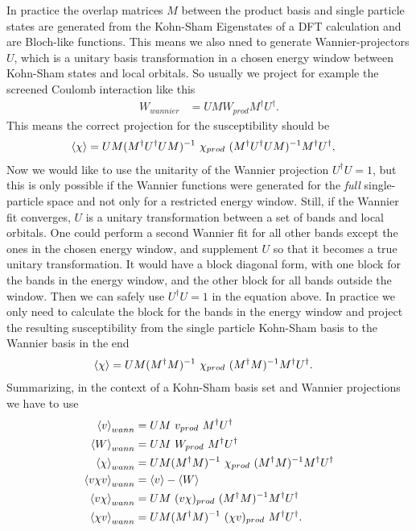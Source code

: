 \documentclass[12pt,a4paper]{scrartcl}
\numberwithin{equation}{section}
\begin{document}
In practice the overlap matrices $M$ between the product basis  
and single particle states are generated from the Kohn-Sham Eigenstates
of a DFT calculation and are Bloch-like functions. This means we also nned to generate 
Wannier-projectors $U$, which is a unitary basis transformation in a chosen energy window
between Kohn-Sham states and local orbitals. So usually we project for example the screened 
Coulomb interaction like this
\begin{align}
 W_{wannier} &= UM W_{prod}M^{\dagger} U^{\dagger}.
\end{align}
This means the correct projection for the susceptibility should be
\begin{align}
 \braket{\chi} &=  U M ( M^{\dagger} U^{\dagger} U M )^{-1} \ \chi_{prod} \ ( M^{\dagger} U^{\dagger} U M )^{-1} M^{\dagger} U^{\dagger},
\end{align}
Now we would like to use the unitarity of the Wannier projection $U^{\dagger} U= 1$, but this is only possible
if the Wannier functions were generated for the \textit{full} single-particle space and not only
for a restricted energy window. Still, if the Wannier fit converges, $U$ is a unitary transformation
between a set of bands and local orbitals. One could perform a second Wannier fit for all other bands except
the ones in the chosen energy window, and supplement $U$ so that it becomes a true unitary transformation.
It would have a block diagonal form, with one block for the bands in the energy window, and the other
block for all bands outside the window.
Then we can safely use $U^{\dagger} U= 1$ in the equation above. In practice we only need to calculate 
the block for the bands in the energy window and project the resulting susceptibility from the 
single particle Kohn-Sham basis to the Wannier basis in the end
\begin{align}
 \braket{\chi} &=  U M ( M^{\dagger} M )^{-1} \ \chi_{prod} \ ( M^{\dagger} M )^{-1} M^{\dagger} U^{\dagger}.
\end{align}
Summarizing, in the context of a Kohn-Sham basis set and Wannier projections we have to use 
\begin{align}
\braket{v}_{wann} &= U M\ v_{prod} \ M^{\dagger} U^{\dagger} \\
 \braket{W}_{wann} &= U M\ W_{prod} \ M^{\dagger} U^{\dagger} \\
 \braket{\chi}_{wann} &= U M ( M^{\dagger} M )^{-1} \ \chi_{prod} \ ( M^{\dagger} M )^{-1} M^{\dagger} U^{\dagger}\\
 \braket{v\chi v}_{wann} &= \braket{v}-\braket{W}\\
 \braket{v \chi}_{wann} &= U M\  (v \chi)_{prod} \ ( M^{\dagger} M )^{-1} M^{\dagger} U^{\dagger}\\
 \braket{\chi v}_{wann} &= U M ( M^{\dagger} M )^{-1}\  (\chi v)_{prod} \ M^{\dagger} U^{\dagger}.
\end{align}
\end{document}
